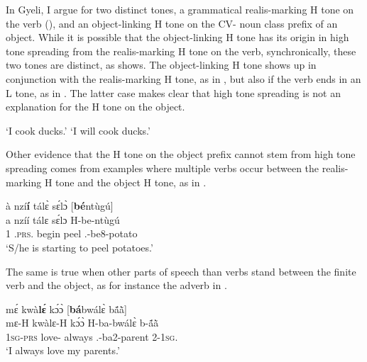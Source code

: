 In Gyeli, I argue for two distinct tones, a grammatical realis-marking H tone on the verb (), and an object-linking H tone on the CV- noun class prefix of an object. While it is possible that the object-linking H tone has its origin in high tone spreading from the realis-marking H tone on the verb, synchronically, these two tones are distinct, as  shows. The object-linking H tone shows up in conjunction with the realis-marking H tone, as in , but also if the verb ends in an L tone, as in . The latter case makes clear that high tone spreading is not an explanation for the H tone on the object.

\ea \label{meta2}
    \trans `I cook ducks.'
    \trans `I will cook ducks.'
\z
\z

Other evidence that the H tone on the object prefix cannot stem from high tone spreading comes from examples where multiple verbs occur between the realis-marking H tone and the object H tone, as in .

\ea \label{me1}
\glll à nzí{\bfseries í} tálɛ̀ sɛ́lɔ̀ [{\bfseries bé}ntùgú]\textsubscript{{\OBJ}} \\
     a nzíí tálɛ sɛ́lɔ {\db}H-be-ntùgú \\
    1 {\PROG}.\textsc{prs}.{\R} begin peel {\db}{\OBJ}.{\LINK}-be8-potato\\
\trans `S/he is starting to peel potatoes.'
\z

\noindent The same is true when other parts of speech than verbs stand between the finite verb and the object, as for instance the adverb in .

\ea\label{me2}
\glll mɛ́ kwà{\bfseries lɛ́}  kɔ́ɔ̀ [{\bfseries bá}bwálɛ̀ bã́ã̀]\textsubscript{{\OBJ}} \\
        mɛ-H kwàlɛ-H  kɔ́ɔ̀ {\db}H-ba-bwálɛ̀ b-ã́ã̀ \\
    1\textsc{sg}-\textsc{prs} love-{\R} always {\db}{\OBJ}.{\LINK}-ba2-parent 2-1\textsc{sg}.{\POSS}\\
\trans `I always love my parents.'
\z

